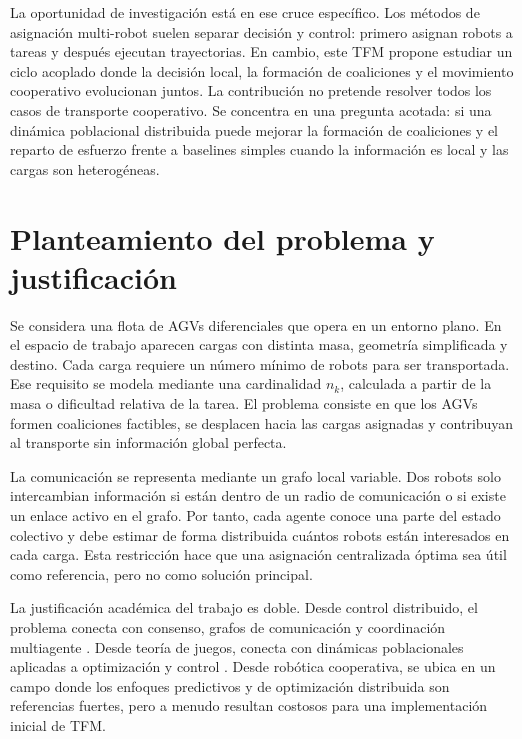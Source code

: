 \documentclass[11pt,a4paper]{article}
\begin{document}
La oportunidad de investigación está en ese cruce específico. Los métodos de asignación multi-robot suelen separar decisión y control: primero asignan robots a tareas y después ejecutan trayectorias. En cambio, este TFM propone estudiar un ciclo acoplado donde la decisión local, la formación de coaliciones y el movimiento cooperativo evolucionan juntos. La contribución no pretende resolver todos los casos de transporte cooperativo. Se concentra en una pregunta acotada: si una dinámica poblacional distribuida puede mejorar la formación de coaliciones y el reparto de esfuerzo frente a baselines simples cuando la información es local y las cargas son heterogéneas.

\section{Planteamiento del problema y justificación}

Se considera una flota de AGVs diferenciales que opera en un entorno plano. En el espacio de trabajo aparecen cargas con distinta masa, geometría simplificada y destino. Cada carga requiere un número mínimo de robots para ser transportada. Ese requisito se modela mediante una cardinalidad $n_k$, calculada a partir de la masa o dificultad relativa de la tarea. El problema consiste en que los AGVs formen coaliciones factibles, se desplacen hacia las cargas asignadas y contribuyan al transporte sin información global perfecta.

La comunicación se representa mediante un grafo local variable. Dos robots solo intercambian información si están dentro de un radio de comunicación o si existe un enlace activo en el grafo. Por tanto, cada agente conoce una parte del estado colectivo y debe estimar de forma distribuida cuántos robots están interesados en cada carga. Esta restricción hace que una asignación centralizada óptima sea útil como referencia, pero no como solución principal.

La justificación académica del trabajo es doble. Desde control distribuido, el problema conecta con consenso, grafos de comunicación y coordinación multiagente \citep{bullo2009distributed,olfati2004consensus,ren2008distributed}. Desde teoría de juegos, conecta con dinámicas poblacionales aplicadas a optimización y control \citep{barreiro2017distributed,quijano2017population}. Desde robótica cooperativa, se ubica en un campo donde los enfoques predictivos y de optimización distribuida son referencias fuertes, pero a menudo resultan costosos para una implementación inicial de TFM.
\end{document}
